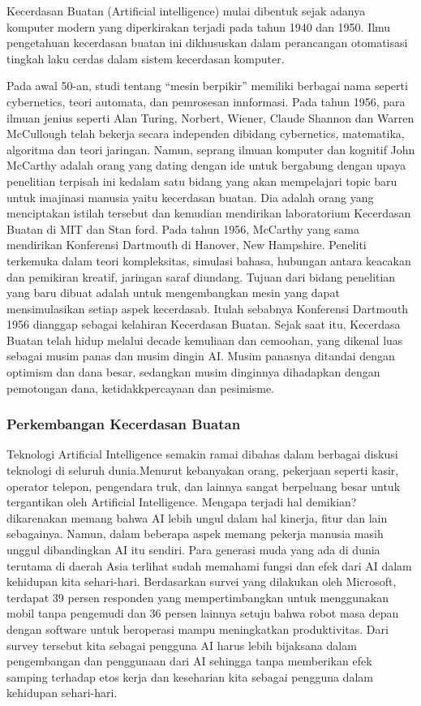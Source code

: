 Kecerdasan Buatan (Artificial intelligence) mulai dibentuk sejak adanya komputer modern yang diperkirakan terjadi pada tahun 1940 dan 1950. Ilmu pengetahuan kecerdasan buatan ini dikhususkan dalam perancangan otomatisasi tingkah laku cerdas dalam sistem kecerdasan komputer. 

Pada awal 50-an, studi tentang “mesin berpikir” memiliki berbagai nama seperti cybernetics, teori automata, dan pemrosesan innformasi. 
Pada tahun 1956, para ilmuan jenius seperti Alan Turing, Norbert, Wiener, Claude Shannon dan Warren McCullough telah bekerja secara independen dibidang cybernetics, matematika, algoritma dan teori jaringan. Namun, seprang ilmuan komputer dan kognitif John McCarthy adalah orang yang dating dengan ide untuk bergabung dengan upaya penelitian terpisah ini kedalam satu bidang yang akan mempelajari topic baru untuk imajinasi manusia yaitu kecerdasan buatan. Dia adalah orang yang menciptakan istilah tersebut dan kemudian mendirikan laboratorium Kecerdasan Buatan di MIT dan Stan ford.
Pada tahun 1956, McCarthy yang sama mendirikan Konferensi Dartmouth di Hanover, New Hampshire. Peneliti terkemuka dalam teori kompleksitas, simulasi bahasa, hubungan antara keacakan dan pemikiran kreatif, jaringan saraf diundang. Tujuan dari bidang penelitian yang baru dibuat adalah untuk mengembangkan mesin yang dapat mensimulasikan setiap aspek kecerdasab. Itulah sebabnya Konferensi Dartmouth 1956 dianggap sebagai kelahiran Kecerdasan Buatan. Sejak saat itu, Kecerdasa Buatan telah hidup melalui decade kemuliaan dan cemoohan, yang dikenal luas sebagai musim panas dan musim dingin AI. Musim panasnya ditandai dengan optimism dan dana besar, sedangkan musim dinginnya dihadapkan dengan pemotongan dana, ketidakkpercayaan dan pesimisme.

\subsubsection{Perkembangan Kecerdasan Buatan}

Teknologi Artificial Intelligence semakin ramai dibahas dalam berbagai diskusi teknologi di seluruh dunia.Menurut kebanyakan orang, pekerjaan seperti kasir, operator telepon, pengendara truk, dan lainnya sangat berpeluang besar untuk tergantikan oleh Artificial Intelligence. Mengapa terjadi hal demikian? dikarenakan memang bahwa AI lebih ungul dalam hal kinerja, fitur dan lain sebagainya. Namun, dalam beberapa aspek memang pekerja manusia masih unggul dibandingkan AI itu sendiri. Para generasi muda yang ada di dunia terutama di daerah Asia terlihat sudah memahami fungsi dan efek dari AI dalam kehidupan kita sehari-hari. Berdasarkan survei yang dilakukan oleh Microsoft, terdapat 39 persen responden yang mempertimbangkan untuk menggunakan mobil tanpa pengemudi dan 36 persen lainnya setuju bahwa robot masa depan dengan software untuk beroperasi mampu meningkatkan produktivitas. Dari survey tersebut kita sebagai pengguna AI harus lebih bijaksana dalam pengembangan dan penggunaan dari AI sehingga tanpa memberikan efek samping terhadap etos kerja dan keseharian kita sebagai pengguna dalam kehidupan sehari-hari.


